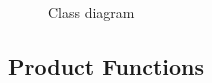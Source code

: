 \documentclass[english]{article}
\begin{document}
\begin{figure}[H]
	\centering
	\caption{Class diagram}
	\label{classdiagram}
\end{figure}


\newpage
\subsection{Product Functions}\label{goals}
\end{document}
